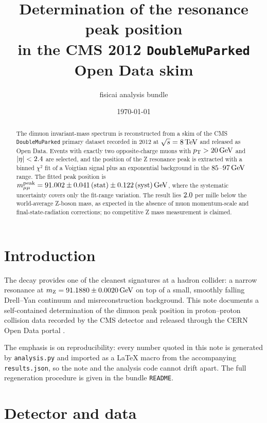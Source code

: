 \documentclass[11pt]{article}
\title{\bfseries Determination of the \Zmm resonance peak position\\
in the CMS 2012 \texttt{DoubleMuParked} Open Data skim}
\author{fisicai analysis bundle}
\date{\today}
\begin{document}
\makenoteheader
\maketitle

\begin{abstract}
The dimuon invariant-mass spectrum is reconstructed from a skim of the CMS
\texttt{DoubleMuParked} primary dataset recorded in 2012 at $\sqrt{s} = 8\,\text{Te\hspace{-.08em}V}$ and
released as Open Data. Events with exactly two opposite-charge muons with
$p_{\mathrm{T}} > 20\,\text{Ge\hspace{-.08em}V}$ and $|\eta| < 2.4$ are selected, and the position of the
Z resonance peak is extracted with a binned $\chi^{2}$ fit of a Voigtian signal
plus an exponential background in the $85$--$97\,\text{Ge\hspace{-.08em}V}$ range. The fitted
peak position is
$m_{\mu\mu}^{\text{peak}} = 91.002 \pm 0.041\,\text{(stat)} \pm 0.122\,\text{(syst)}\,\text{Ge\hspace{-.08em}V}$,
where the systematic uncertainty covers only the fit-range variation. The result
lies $2.0$ per mille below the world-average Z-boson mass, as
expected in the absence of muon momentum-scale and final-state-radiation
corrections; no competitive Z mass measurement is claimed.
\end{abstract}

\section{Introduction}

The decay \Zmm provides one of the cleanest signatures at a hadron collider: a
narrow resonance at $m_{\mathrm{Z}} = 91.1880 \pm 0.0020\,\text{Ge\hspace{-.08em}V}$
\cite{ParticleDataGroup:2024cfk} on top of a small, smoothly falling Drell--Yan
continuum and misreconstruction background. This note documents a self-contained
determination of the dimuon peak position in proton--proton collision data
recorded by the CMS detector \cite{CMS:2008xjf} and released through the CERN
Open Data portal \cite{Lassila-Perini:2021xzn}.

The emphasis is on reproducibility: every number quoted in this note is
generated by \texttt{analysis.py} and imported as a \LaTeX{} macro from the
accompanying \texttt{results.json}, so the note and the analysis code cannot
drift apart. The full regeneration procedure is given in the bundle
\texttt{README}.

\section{Detector and data}
\end{document}
